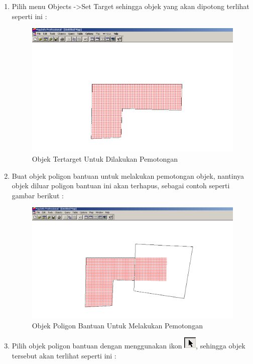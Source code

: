 \begin{enumerate}[\bfseries A.]
\begin{enumerate}[1.]
    \item Pilih menu Objects -\textgreater Set Target sehingga objek yang akan dipotong terlihat seperti ini :
    
    \begin{figure}[H]
      \centering
      \includegraphics[width=1\textwidth]{./resources/034-objek-tertarget-untuk-erase-2}
      \caption{Objek Tertarget Untuk Dilakukan Pemotongan}
    \end{figure}
    
    \item Buat objek poligon bantuan untuk melakukan pemotongan objek, nantinya objek diluar poligon bantuan ini akan terhapus, sebagai contoh seperti gambar berikut :
    
    \begin{figure}[H]
      \centering
      \includegraphics[width=1\textwidth]{./resources/035-poligon-bantuan-untuk-erase-2}
      \caption{Objek Poligon Bantuan Untuk Melakukan Pemotongan}
    \end{figure}
    
    \item Pilih objek poligon bantuan dengan menggunakan ikon \includegraphics{./resources/008-ikon-select}, sehingga objek tersebut akan terlihat seperti ini :
    

\end{enumerate}
\end{enumerate}

